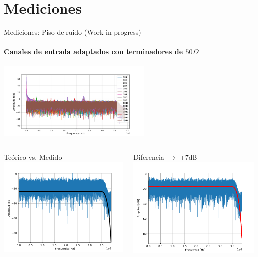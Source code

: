 \documentclass[ignorenonframetext,12pt]{beamer}
\begin{document}
\section{Mediciones}
				\begin{frame}{Mediciones: Piso de ruido (Work in progress)}
								\framesubtitle{Canales de entrada adaptados con terminadores de
								$50\,\Omega$}
								\begin{center}
												\includegraphics[width=0.56\textwidth]{noise_floor_rxch16}
								\end{center}
								\begin{columns}
												\begin{column}{0.5\textwidth}{\footnotesize{Teórico vs.
																Medido}}
																\includegraphics[width=\textwidth]{ch1}
												\end{column}
												\begin{column}{0.5\textwidth}{\footnotesize{Diferencia
																$\to$ +7dB}}
																\includegraphics[width=\textwidth]{ch1_plus7dB}

\end{column}
\end{columns}
\end{frame}
\end{document}
